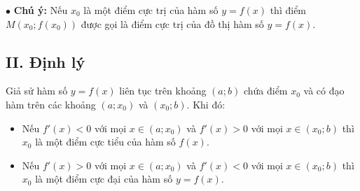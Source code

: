 \documentclass[12pt,a4paper]{extarticle}
\begin{document}
\noindent $\bullet$ \textbf{Chú ý:} Nếu $x_0$ là một điểm cực trị của hàm số $y = f(x)$ thì điểm $M(x_0; f(x_0))$ được gọi là điểm cực trị của đồ thị hàm số $y = f(x)$.

\subsection*{II. Định lý}

Giả sử hàm số $y = f(x)$ liên tục trên khoảng $(a; b)$ chứa điểm $x_0$ và có đạo hàm trên các khoảng $(a; x_0)$ và $(x_0; b)$. Khi đó:
\begin{itemize}
	\item Nếu $f'(x) < 0$ với mọi $x \in (a; x_0)$ và $f'(x) > 0$ với mọi $x \in (x_0; b)$ thì $x_0$ là một điểm cực tiểu của hàm số $f(x)$.
	\item Nếu $f'(x) > 0$ với mọi $x \in (a; x_0)$ và $f'(x) < 0$ với mọi $x \in (x_0; b)$ thì $x_0$ là một điểm cực đại của hàm số $y = f(x)$.
\end{itemize}
\end{document}
